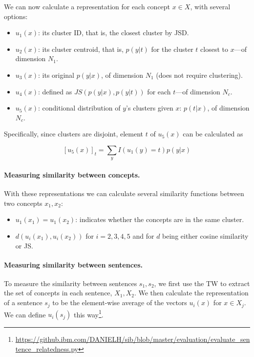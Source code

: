 \documentclass{article}
\begin{document}
    We can now calculate a representation for each concept $x\in X$,
    with several options:
    \begin{itemize}
        \item $u_1(x)$: its cluster ID, that is, the closest cluster by JSD.
        \item $u_2(x)$: its cluster centroid, that is, $p(y|t)$ for the cluster
        $t$ closest to $x$---of dimension $N_1$.
        \item $u_3(x)$: its original $p(y|x)$, of dimension $N_1$ (does not require clustering).
        \item $u_4(x)$: defined as $JS(p(y|x),p(y|t))$ for each $t$---of dimension $N_c$.
        \item $u_5(x)$: conditional distribution of $y$'s clusters given $x$: $p(t|x)$,
        of dimension $N_c$.
    \end{itemize}
    
    Specifically, since clusters are disjoint, element $t$ of $u_5(x)$ can be calculated as
    
    \[
    [u_5(x)]_t = \sum_{y} I(u_1(y)=t) p(y|x)
    \]

    \paragraph{Measuring similarity between concepts.}

    With these representations we can calculate several similarity functions
    between two concepts $x_1,x_2$:
    \begin{itemize}
        \item $u_1(x_1)=u_1(x_2)$:
        indicates whether the concepts are in the same cluster.
        \item $d(u_i(x_1),u_i(x_2))$ for $i=2,3,4,5$ and for $d$ being either
        cosine similarity or JS.
    \end{itemize}


    \paragraph{Measuring similarity between sentences.}

    To measure the similarity between sentences $s_1,s_2$, we first use the TW
    to extract the set of concepts in each sentence, $X_1,X_2$.
    We then calculate the representation of a sentence $s_j$ to be the element-wise average
    of the vectors $u_i(x)$ for $x\in X_j$.
    We can define $u_i(s_j)$ this
    way\footnote{\url{https://github.ibm.com/DANIELH/sib/blob/master/evaluation/evaluate_sentence_relatedness.py}}.
\end{document}
